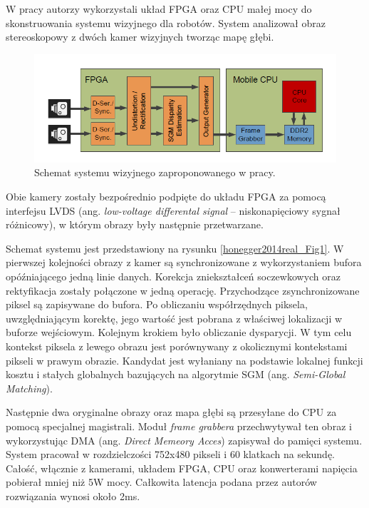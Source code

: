 W pracy \cite{honegger2014real} autorzy wykorzystali układ FPGA oraz CPU małej mocy do skonstruowania systemu wizyjnego dla robotów. 
System analizował obraz stereoskopowy z dwóch kamer wizyjnych tworząc mapę głębi. 
\begin{figure}[h]
    \centering
    \includegraphics[width=1\textwidth]{images/honegger2014real_Fig1}
    \caption{Schemat systemu wizyjnego zaproponowanego w pracy\cite{honegger2014real}.}
    \label{fig: honegger2014real_Fig1}
\end{figure}
Obie kamery zostały bezpośrednio podpięte do układu FPGA za pomocą interfejsu LVDS (ang. \textit{low-voltage differental signal} – niskonapięciowy sygnał różnicowy), w którym obrazy były następnie przetwarzane. 


Schemat systemu jest przedstawiony na rysunku \ref{honegger2014real_Fig1}. W pierwszej kolejności obrazy z kamer są synchronizowane z wykorzystaniem bufora opóźniającego jedną linie danych. 
Korekcja zniekształceń soczewkowych oraz rektyfikacja zostały połączone w jedną operację. Przychodzące zsynchronizowane piksel są zapisywane do bufora. Po obliczaniu współrzędnych piksela, uwzględniającym korektę, jego wartość jest pobrana z właściwej lokalizacji w buforze wejściowym. Kolejnym krokiem było obliczanie dysparycji. W tym celu kontekst piksela z lewego obrazu jest porównywany z okolicznymi kontekstami pikseli w prawym obrazie. Kandydat jest wyłaniany na podstawie lokalnej funkcji kosztu i stałych globalnych bazujących na algorytmie SGM (ang. \textit{Semi-Global Matching}). 

Następnie dwa oryginalne obrazy oraz mapa głębi są przesyłane do CPU za pomocą specjalnej magistrali.
Moduł \textit{frame grabbera} przechwytywał ten obraz i wykorzystując DMA (ang. \textit{Direct Memeory Acces}) zapisywał do pamięci systemu.
System pracował w rozdzielczości 752x480 pikseli i 60 klatkach na sekundę. 
Całość, włącznie z kamerami, układem FPGA, CPU oraz konwerterami napięcia pobierał mniej niż 5W mocy. 
Całkowita latencja podana przez autorów rozwiązania wynosi około 2ms.

